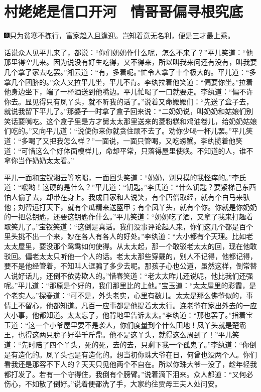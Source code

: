 

\chapter{村姥姥是信口开河　情哥哥偏寻根究底}

{\includegraphics[width=3mm]{../Images/00005}只为贫寒不拣行，富家趋入且逢迎。岂知着意无名利，便是三才最上乘。}

话说众人见平儿来了，都说：``你们奶奶作什么呢，怎么不来了？''平儿笑道：``他那里得空儿来。因为说没有好生吃得，又不得来，所以叫我来问还有没有，叫我要几个拿了家去吃罢。''湘云道：``有，多着呢。''忙令人拿了十个极大的。平儿道：``多拿几个团脐的。''众人又拉平儿坐，平儿不肯。李纨拉着他笑道：``偏要你坐。''拉着他身边坐下，端了一杯酒送到他嘴边。平儿忙喝了一口就要走。李纨道：``偏不许你去。显见得只有凤丫头，就不听我的话了。''说着又命嬷嬷们：``先送了盒子去，就说我留下平儿了。''那婆子一时拿了盒子回来说：``二奶奶说，叫奶奶和姑娘们别笑话要嘴吃。这个盒子里是方才舅太太那里送来的菱粉糕和鸡油卷儿，给奶奶姑娘们吃的。''又向平儿道：``说使你来你就贪住顽不去了。劝你少喝一杯儿罢。''平儿笑道：``多喝了又把我怎么样？''一面说，一面只管喝，又吃螃蟹。李纨揽着他笑道：``可惜这么个好体面模样儿，命却平常，只落得屋里使唤。不知道的人，谁不拿你当作奶奶太太看。''

平儿一面和宝钗湘云等吃喝，一面回头笑道：``奶奶，别只摸的我怪痒的。''李氏道：``嗳哟！这硬的是什么？''平儿道：``钥匙。''李氏道：``什么钥匙？要紧梯己东西怕人偷了去，却带在身上。我成日家和人说笑，有个唐僧取经，就有个白马来驮他；刘智远打天下，就有个瓜精来送盔甲；有个凤丫头，就有个你。你就是你奶奶的一把总钥匙，还要这钥匙作什么。''平儿笑道：``奶奶吃了酒，又拿了我来打趣着取笑儿了。''宝钗笑道：``这倒是真话。我们没事评论起人来，你们这几个都是百个里头挑不出一个来，妙在各人有各人的好处。''李纨道：``大小都有个天理。比如老太太屋里，要没那个鸳鸯如何使得。从太太起，那一个敢驳老太太的回，现在他敢驳回。偏老太太只听他一个人的话。老太太那些穿戴的，别人不记得，他都记得，要不是他经管着，不知叫人诓骗了多少去呢。那孩子心也公道，虽然这样，倒常替人说好话儿，还倒不依势欺人的。''惜春笑道：``老太太昨儿还说呢，他比我们还强呢。''平儿道：``那原是个好的，我们那里比的上他。''宝玉道：``太太屋里的彩霞，是个老实人。''探春道：``可不是，外头老实，心里有数儿。太太是那么佛爷似的，事情上不留心，他都知道。凡百一应事都是他提着太太行。连老爷在家出外去的一应大小事，他都知道。太太忘了，他背地里告诉太太。''李纨道：``那也罢了。''指着宝玉道：``这一个小爷屋里要不是袭人，你们度量到个什么田地！凤丫头就是楚霸王，也得这两只膀子好举千斤鼎。他不是这丫头，就得这么周到了！''平儿笑道：``先时陪了四个丫头，死的死，去的去，只剩下我一个孤鬼了。''李纨道：``你倒是有造化的。凤丫头也是有造化的。想当初你珠大爷在日，何曾也没两个人。你们看我还是那容不下人的？天天只见他两个不自在。所以你珠大爷一没了，趁年轻我都打发了。若有一个守得住，我倒有个膀臂。''说着滴下泪来。众人都道：``又何必伤心，不如散了倒好。''说着便都洗了手，大家约往贾母王夫人处问安。

